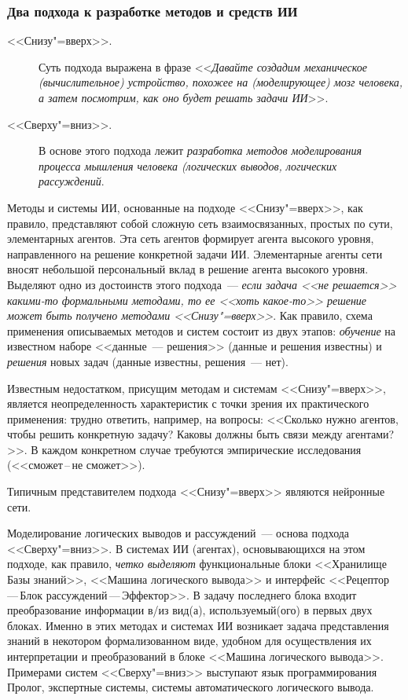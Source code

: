 \documentclass[a4paper,14pt, openany, twoside, draft]{extbook} %
\begin{document}
\subsubsection*{Два подхода к разработке методов и средств ИИ}
\begin{mygroup}
\begin{description}
\item[<<Снизу"=вверх>>.] Суть подхода выражена в фразе <<{\em Давайте создадим механическое (вычислительное) устройство, похожее на (моделирующее) мозг человека, а затем посмотрим, как оно будет решать задачи ИИ}>>.
\item[<<Сверху"=вниз>>.] В основе этого подхода лежит {\em разработка методов моделирования процесса мышления человека (логических выводов, логических рассуждений}.
\end{description}

Методы и системы ИИ, основанные на подходе <<Снизу"=вверх>>, как правило, представляют собой сложную сеть взаимосвязанных, простых по сути, элементарных агентов. Эта сеть агентов формирует агента высокого уровня, направленного на решение конкретной задачи ИИ. Элементарные агенты сети вносят небольшой персональный вклад в решение агента высокого уровня. Выделяют одно из достоинств этого подхода~--- {\em если задача <<не решается>> какими-то формальными методами, то ее <<хоть какое-то>> решение может быть получено методами <<Снизу"=вверх>>}. Как правило, схема применения описываемых методов и систем состоит из двух этапов: {\em обучение} на известном наборе <<данные~--- решения>> (данные и решения известны) и {\em решения} новых задач (данные известны, решения~--- нет).

Известным недостатком, присущим методам и системам <<Снизу"=вверх>>, является неопределенность характеристик с точки зрения их практического применения: трудно ответить, например, на вопросы: <<Сколько нужно агентов, чтобы решить конкретную задачу? Каковы должны быть связи между агентами?>>. В каждом конкретном случае требуются эмпирические исследования (<<сможет\,{}--\,{}не сможет>>).

Типичным представителем подхода <<Снизу"=вверх>> являются нейронные сети.

Моделирование логических выводов и рассуждений~--- основа подхода <<Сверху"=вниз>>. В системах ИИ (агентах), основывающихся на этом подходе, как правило, {\em четко выделяют} функциональные блоки <<Хранилище Базы знаний>>, <<Машина логического вывода>> и интерфейс <<Рецептор\,{}---\,{}Блок  рассуждений\,{}---\,{}Эффектор>>. В задачу последнего блока входит преобразование информации в/из вид(а), используемый(ого) в первых двух блоках. Именно в этих методах и системах ИИ возникает задача представления знаний в некотором формализованном виде, удобном для осуществления их интерпретации и преобразований в блоке <<Машина логического вывода>>. Примерами систем <<Сверху"=вниз>> выступают язык программирования Пролог, экспертные системы, системы автоматического логического вывода.
\end{mygroup}
\end{document}
